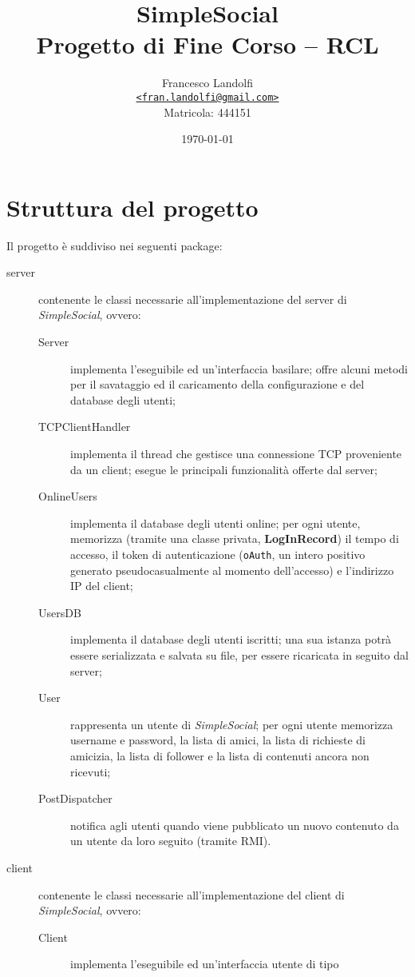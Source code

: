 \documentclass[11pt]{article}
\title{\textbf{SimpleSocial}\\Progetto di Fine Corso -- RCL}
\author{
	Francesco Landolfi\\
	\href{mailto:fran.landolfi@gmail.com}
	{\tt<fran.landolfi@gmail.com>}\\
	Matricola: 444151
}
\date{\today}
\begin{document}
\maketitle


\section{Struttura del progetto}

Il progetto è suddiviso nei seguenti package:

\begin{description}
	\item[server] contenente le classi necessarie all'implementazione del
	server di \emph{SimpleSocial}, ovvero:
	\begin{description}
		\item[Server] implementa l'eseguibile ed un'interfaccia basilare; offre
		alcuni metodi per il savataggio ed il caricamento della configurazione e
		del database degli utenti;
		\item[TCPClientHandler] implementa il thread che gestisce una
		connessione TCP proveniente da un client; esegue le principali
		funzionalità offerte dal server;
		\item[OnlineUsers] implementa il database degli utenti online; per ogni
		utente, memorizza (tramite una classe privata, {\bf LogInRecord}) il
		tempo di accesso, il token di autenticazione ({\tt oAuth}, un intero
		positivo generato pseudocasualmente al momento dell'accesso) e
		l'indirizzo IP del client;
		\item[UsersDB] implementa il database degli utenti iscritti; una sua
		istanza potrà essere serializzata e salvata su file, per essere
		ricaricata in seguito dal server;
		\item[User] rappresenta un utente di \emph{SimpleSocial}; per ogni
		utente memorizza username e password, la lista di amici, la lista di
		richieste di amicizia, la lista di follower e la lista di contenuti
		ancora non ricevuti;
		\item[PostDispatcher] notifica agli utenti quando viene pubblicato un
		nuovo contenuto da un utente da loro seguito (tramite RMI).
	\end{description}
	\item[client] contenente le classi necessarie all'implementazione del
	client di \emph{SimpleSocial}, ovvero:
	\begin{description}
		\item[Client] implementa l'eseguibile ed un'interfaccia utente di tipo

\end{description}
\end{description}
\end{document}
